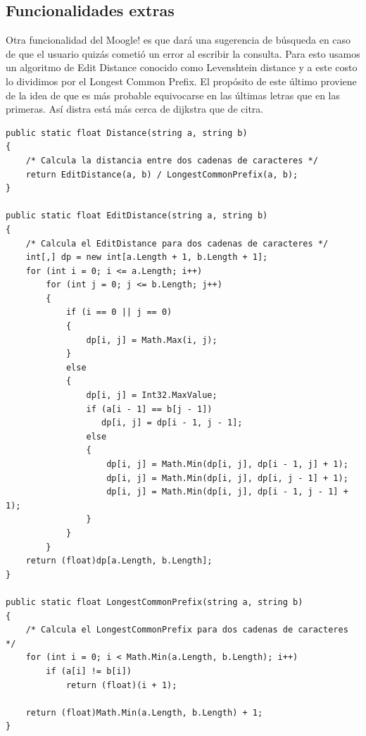 \documentclass[12pt, a4paper]{article}
\begin{document}
\subsection*{Funcionalidades extras}

Otra funcionalidad del Moogle! es que dará una sugerencia de búsqueda en caso de que el usuario quizás
cometió un error al escribir la consulta. Para esto usamos un algoritmo de Edit Distance conocido como
Levenshtein distance y a este costo lo dividimos por el Longest Common Prefix. El propósito de este último
proviene de la idea de que es más probable equivocarse en las últimas letras que en las primeras. Así distra
está más cerca de dijkstra que de citra.

\begin{lstlisting}
public static float Distance(string a, string b)
{
    /* Calcula la distancia entre dos cadenas de caracteres */
    return EditDistance(a, b) / LongestCommonPrefix(a, b);
}

public static float EditDistance(string a, string b)
{
    /* Calcula el EditDistance para dos cadenas de caracteres */
    int[,] dp = new int[a.Length + 1, b.Length + 1];
    for (int i = 0; i <= a.Length; i++)
        for (int j = 0; j <= b.Length; j++)
        {
            if (i == 0 || j == 0)
            {
                dp[i, j] = Math.Max(i, j);
            }
            else
            {
                dp[i, j] = Int32.MaxValue;
                if (a[i - 1] == b[j - 1])
                   dp[i, j] = dp[i - 1, j - 1];
                else
                {
                    dp[i, j] = Math.Min(dp[i, j], dp[i - 1, j] + 1);
                    dp[i, j] = Math.Min(dp[i, j], dp[i, j - 1] + 1);
                    dp[i, j] = Math.Min(dp[i, j], dp[i - 1, j - 1] + 1);
                }
            }
        }
    return (float)dp[a.Length, b.Length];
}

public static float LongestCommonPrefix(string a, string b)
{
    /* Calcula el LongestCommonPrefix para dos cadenas de caracteres */
    for (int i = 0; i < Math.Min(a.Length, b.Length); i++)
        if (a[i] != b[i])
            return (float)(i + 1);
    
    return (float)Math.Min(a.Length, b.Length) + 1;
}
\end{lstlisting}
\end{document}
